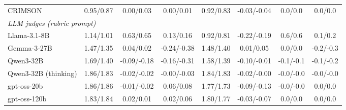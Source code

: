 \begin{tabular}{lccccccc}
CRIMSON & 0.95/0.87 & 0.00/0.03 & 0.00/0.01 & 0.92/0.83 & -0.03/-0.04 & 0.0/0.0 & 0.0/0.0 \\
\multicolumn{8}{l}{\textit{LLM judges (rubric prompt)}} \\
Llama-3.1-8B & 1.14/1.01 & 0.63/0.65 & 0.13/0.16 & 0.92/0.81 & -0.22/-0.19 & 0.6/0.6 & 0.1/0.2 \\
Gemma-3-27B & 1.47/1.35 & 0.04/0.02 & -0.24/-0.38 & 1.48/1.40 & 0.01/0.05 & 0.0/0.0 & -0.2/-0.3 \\
Qwen3-32B & 1.69/1.40 & -0.09/-0.18 & -0.16/-0.31 & 1.58/1.39 & -0.10/-0.01 & -0.1/-0.1 & -0.1/-0.2 \\
Qwen3-32B (thinking) & 1.86/1.83 & -0.02/-0.02 & -0.00/-0.03 & 1.84/1.83 & -0.02/-0.00 & -0.0/-0.0 & -0.0/-0.0 \\
gpt-oss-20b & 1.86/1.86 & -0.01/-0.02 & 0.06/0.08 & 1.77/1.73 & -0.09/-0.13 & -0.0/-0.0 & 0.0/0.0 \\
gpt-oss-120b & 1.83/1.84 & 0.02/0.01 & 0.02/0.06 & 1.80/1.77 & -0.03/-0.07 & 0.0/0.0 & 0.0/0.0 \\
\bottomrule
\end{tabular}